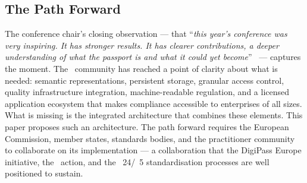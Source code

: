 \subsection{The Path Forward}

The conference chair's closing observation --- that ``\textit{this year's
conference was very inspiring. It has stronger results. It has clearer
contributions, a deeper understanding of what the passport is and what it could
yet become}''~\cite{dpp4eu2026_day3} --- captures the moment. The \DPP\
community has reached a point of clarity about what is needed: semantic
representations, persistent storage, granular access control, quality
infrastructure integration, machine-readable regulation, and a licensed
application ecosystem that makes compliance accessible to enterprises of all
sizes. What is missing is the integrated architecture that combines these
elements. This paper proposes such an architecture. The path forward requires
the European Commission, member states, standards bodies, and the practitioner
community to collaborate on its implementation --- a collaboration that the
DigiPass Europe initiative, the \COST\ action, and the \JTC~24/\JTC~5
standardisation processes are well positioned to sustain.
